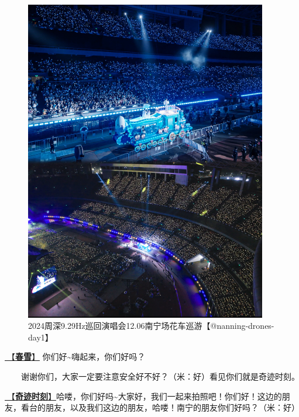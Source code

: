 \documentclass[]{ctexbook}
\begin{document}
\begin{figure}

{\centering \includegraphics[width=300pt]{img/nanning20241206/003} 

}

\caption{2024周深9.29Hz巡回演唱会12.06南宁场花车巡游【@nanning-drones-day1】}\label{fig:unnamed-chunk-130}
\end{figure}

\hyperref[spring-snow]{🎵【\textbf{春雪}】} 你们好\textasciitilde 嗨起来，你们好吗？

  谢谢你们，大家一定要注意安全好不好？（米：好）看见你们就是奇迹时刻。

\hyperref[magic-moment]{🎵【\textbf{奇迹时刻}】}哈喽，你们好吗\textasciitilde 大家好，我们一起来拍照吧！你们好！这边的朋友，看台的朋友，以及我们这边的朋友，哈喽！南宁的朋友你们好吗？（米：好）
\end{document}
